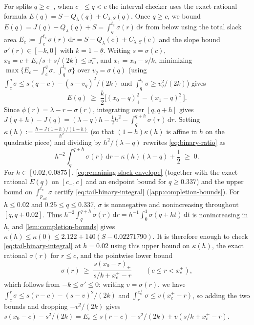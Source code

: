 \documentclass[11pt]{article}
\numberwithin{equation}{section}
\theoremstyle{plain}
\theoremstyle{definition}
\newcommand{\1}{\mathbf{1}}
\begin{document}
For splits $q \ge c_-$, when $c_- \le q < c$ the interval checker uses the exact rational formula $E(q) = S - Q_\lambda(q) + C_{\lambda, S}(q)$. Once $q \ge c$, we bound $E(q) = J(q) - Q_\lambda(q) + S = \int_q^{t_e} \sigma(r)\,\mathrm{d}r$ from below using the total slack area $E_c := \int_c^{t_e} \sigma(r)\,\mathrm{d}r = S - Q_\lambda(c) + C_{\lambda, S}(c)$ and the slope bound $\sigma'(r) \in [-k, 0]$ with $k = 1 - \underline{\theta}$. Writing $s = \sigma(c)$, $x_0 = c + E_c/s + s/(2k) \le x_c^+$, and $x_1 = x_0 - s/k$, minimizing $\max\bigl\{E_c - \int_c^q \sigma,\, \int_q^{t_e} \sigma\bigr\}$ over $v_q = \sigma(q)$ (using $\int_c^q \sigma \le s(q - c) - (s - v_q)^2/(2k)$ and $\int_q^{t_e} \sigma \ge v_q^2/(2k)$) gives
\begin{equation}
  E(q) \;\ge\; \frac{k}{2}\bigl[(x_0 - q)_+^2 - (x_1 - q)_+^2\bigr].
  \label{eq:remaining-slack-envelope}
\end{equation}
Since $\phi(r) = \lambda - r - \sigma(r)$, integrating over $[q, q + h]$ gives $J(q + h) - J(q) = (\lambda - q)h - \frac{1}{2}h^2 - \int_q^{q+h} \sigma(r)\,\mathrm{d}r$. Setting $\kappa(h) := \frac{h - J(1 - h)/(1 - h)}{h^2}$ (so that $(1 - h)\kappa(h)$ is affine in $h$ on the quadratic piece) and dividing by $h^2 / (\lambda - q)$ rewrites \cref{eq:binary-ratio} as
\begin{equation}
  h^{-2}\int_q^{q+h} \sigma(r)\,\mathrm{d}r - \kappa(h)(\lambda - q) + \frac{1}{2} \;\ge\; 0.
  \label{eq:tail-binary-integral}
\end{equation}
For $h \in [0.02, 0.0875]$, \cref{eq:remaining-slack-envelope} (together with the exact rational $E(q)$ on $[c_-, c]$ and an endpoint bound for $q \ge 0.337$) and the upper bound on $\int_{p_{\mathrm{ref}}}^{t_e} \sigma$ certify \cref{eq:tail-binary-integral} (\cref{app:completion-bounds}). For $h\le0.02$ and $0.25\le q\le0.337$, $\sigma$ is nonnegative and nonincreasing throughout $[q,q+0.02]$. Thus $h^{-2}\int_q^{q+h}\sigma(r)\,\mathrm{d}r=h^{-1}\int_0^1\sigma(q+ht)\,\mathrm{d}t$ is nonincreasing in $h$, and \cref{lem:completion-bounds} gives $\kappa(h) \le \kappa(0) \le 2.122 + 140(S - 0.02271790)$. It is therefore enough to check \cref{eq:tail-binary-integral} at $h = 0.02$ using this upper bound on $\kappa(h)$, the exact rational $\sigma(r)$ for $r \le c$, and the pointwise lower bound
\begin{equation}
  \sigma(r) \;\ge\; \frac{s(x_0 - r)_+}{s/k + x_c^+ - r}
  \qquad (c \le r < x_c^+),
  \label{eq:sigma-pointwise-floor}
\end{equation}
which follows from $-k \le \sigma' \le 0$: writing $v = \sigma(r)$, we have $\int_c^r \sigma \le s(r - c) - (s - v)^2/(2k)$ and $\int_r^{x_c^+} \sigma \le v(x_c^+ - r)$, so adding the two bounds and dropping $-v^2/(2k)$ gives $s(x_0 - c) - s^2/(2k) = E_c \le s(r - c) - s^2/(2k) + v(s/k + x_c^+ - r)$.
\end{document}
